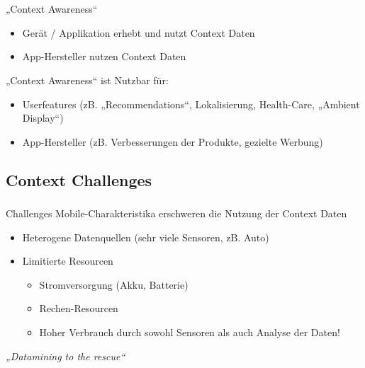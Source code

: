 \begin{frame}
    \frametitle{\insertsubsection \ \ \small \cite{context2015} \cite{orsini2016}} 
    „Context Awareness“
    \vspace{0.8em}
    \begin{itemize}
        \setlength\itemsep{0.7em}
        \item Gerät / Applikation erhebt und nutzt Context Daten
        \item App-Hersteller nutzen Context Daten
    \end{itemize}
    \vspace{2em}

    \begin{block}{„Context Awareness“ ist Nutzbar für:}
        \begin{itemize}%
            \setlength\itemsep{0.7em}
            \item Userfeatures (zB. „Recommendations“, Lokalisierung, Health-Care, „Ambient Display“)
            \item App-Hersteller (zB. Verbesserungen der Produkte, gezielte Werbung)
        \end{itemize}
    \end{block}
\end{frame}

\subsection{Context Challenges}

\begin{frame}
    \frametitle{\insertsubsection} 
    \begin{block}{Challenges \cite{context2015} \cite{orsini2016}}
        \vspace{0.5em}
        Mobile-Charakteristika erschweren die Nutzung der Context Daten 
        \vspace{1em}
        \begin{itemize}%
            \setlength\itemsep{1em}
            \item Heterogene Datenquellen (sehr viele Sensoren, zB. Auto)
            \item Limitierte Resourcen
            \begin{itemize}%
                \setlength\itemsep{0.4em}
                \item Stromversorgung (Akku, Batterie) 
                \item Rechen-Resourcen
                \item Hoher Verbrauch durch sowohl Sensoren als auch Analyse der Daten!
            \end{itemize}
        \end{itemize}
    \end{block}
    \vspace{1em}
    \emph{„Datamining to the rescue“}
\end{frame}